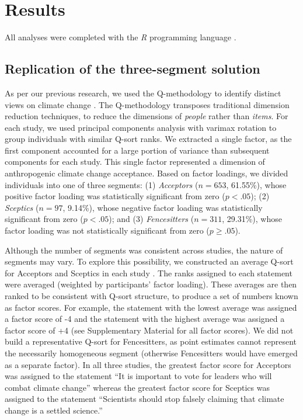 \documentclass[
  letterpaper,
  DIV=11,
  numbers=noendperiod]{scrartcl}
\begin{document}
\section{Results}\label{results}

All analyses were completed with the \emph{R} programming language
\citep{rcoreteam_2023}.

\subsection{Replication of the three-segment
solution}\label{replication-of-the-three-segment-solution}

As per our previous research, we used the Q-methodology to identify
distinct views on climate change \citep{brown1980}. The Q-methodology
transposes traditional dimension reduction techniques, to reduce the
dimensions of \emph{people} rather than \emph{items}. For each study, we
used principal components analysis with varimax rotation to group
individuals with similar Q-sort ranks. We extracted a single factor, as
the first component accounted for a large portion of variance than
subsequent components for each study. This single factor represented a
dimension of anthropogenic climate change acceptance. Based on factor
loadings, we divided individuals into one of three segments: (1)
\emph{Acceptors} (\(n = 653\), 61.55\%), whose positive factor loading
was statistically significant from zero (\(p < .05\)); (2)
\emph{Sceptics} (\(n = 97\), 9.14\%), whose negative factor loading was
statistically significant from zero (\(p < .05\)); and (3)
\emph{Fencesitters} (\(n = 311\), 29.31\%), whose factor loading was not
statistically significant from zero (\(p \ge .05\)).

Although the number of segments was consistent across studies, the
nature of segments may vary. To explore this possibility, we constructed
an average Q-sort for Acceptors and Sceptics in each study
\citep{brown1980}. The ranks assigned to each statement were averaged
(weighted by participants' factor loading). These averages are then
ranked to be consistent with Q-sort structure, to produce a set of
numbers known as factor scores. For example, the statement with the
lowest average was assigned a factor score of -4 and the statement with
the highest average was assigned a factor score of +4 (see Supplementary
Material for all factor scores). We did not build a representative
Q-sort for Fencesitters, as point estimates cannot represent the
necessarily homogeneous segment (otherwise Fencesitters would have
emerged as a separate factor). In all three studies, the greatest factor
score for Acceptors was assigned to the statement ``It is important to
vote for leaders who will combat climate change'' whereas the greatest
factor score for Sceptics was assigned to the statement ``Scientists
should stop falsely claiming that climate change is a settled science.''
\end{document}
